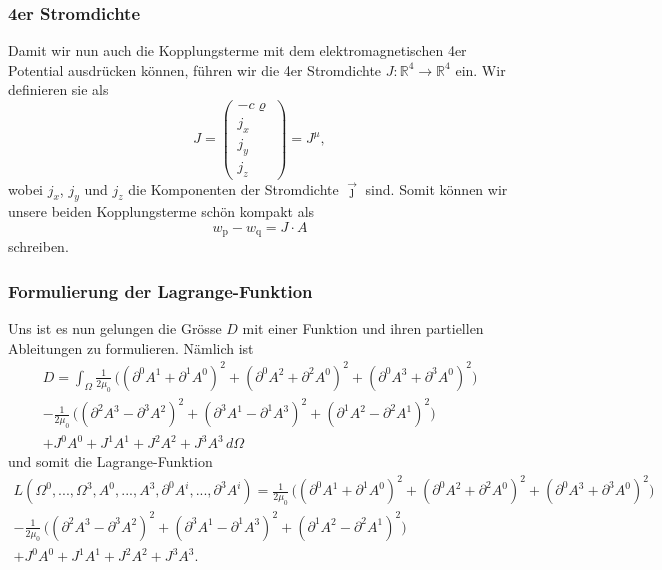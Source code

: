 \subsubsection{4er Stromdichte}
Damit wir nun auch die Kopplungsterme mit dem elektromagnetischen 4er Potential ausdrücken können, führen wir die 4er Stromdichte
\(
J:\mathbb{R}^4 \rightarrow \mathbb{R}^4
\)
ein. Wir definieren sie als
\begin{equation}
J
=
\begin{pmatrix}
	-c\varrho\\
	j_x\\
	j_y\\
	j_z
\end{pmatrix}
=
J^{\mu},
\end{equation}
wobei $j_x$, $j_y$ und $j_z$ die Komponenten der Stromdichte $\vec{\jmath}$ sind.
Somit können wir unsere beiden Kopplungsterme schön kompakt  als
\begin{equation}
	w_{\text{p}} - w_{\text{q}}
	=
	J\cdot A
\end{equation}
schreiben.

\subsubsection{Formulierung der Lagrange-Funktion}
Uns ist es nun gelungen die Grösse $D$ mit einer Funktion und ihren partiellen Ableitungen zu formulieren. Nämlich ist 
\begin{align*}
D
=
\int_{\Omega}
\frac{1}{2\mu_0}\,\biggl(\left(\partial^0 A^1 + \partial^1 A^0\right)^2 + \left(\partial^0 A^2 + \partial^2 A^0\right)^2 + 
\left(\partial^0 A^3 + \partial^3 A^0\right)^2\biggr) \\
-  \frac{1}{2\mu_0}\,\biggl(\left(\partial^2 A^3 - \partial^3 A^2\right)^2 + \left(\partial^3 A^1 - \partial^1 A^3\right)^2 + 
\left(\partial^1 A^2 - \partial^2 A^1\right)^2\biggr)\\
+ J^0 A^0 + J^1 A^1 + J^2 A^2 + J^3 A^3 \,d\Omega
\end{align*}
und somit die Lagrange-Funktion
\begin{align*}
L(\Omega^0,...,\Omega^3, A^0,...,A^3, \partial^0 A^i,...,\partial^3 A^i)
=
\frac{1}{2\mu_0}\,\biggl(\left(\partial^0 A^1 + \partial^1 A^0\right)^2 + \left(\partial^0 A^2 + \partial^2 A^0\right)^2 + 
\left(\partial^0 A^3 + \partial^3 A^0\right)^2\biggr) \\
-  \frac{1}{2\mu_0}\,\biggl(\left(\partial^2 A^3 - \partial^3 A^2\right)^2 + \left(\partial^3 A^1 - \partial^1 A^3\right)^2 + 
\left(\partial^1 A^2 - \partial^2 A^1\right)^2\biggr)\\
+ J^0 A^0 + J^1 A^1 + J^2 A^2 + J^3 A^3.
\end{align*}

